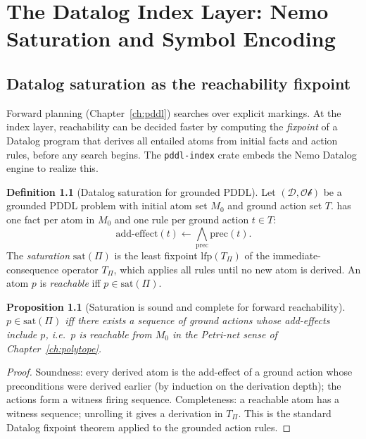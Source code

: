 \documentclass[11pt,oneside]{book}
\theoremstyle{definition}
\newtheorem{definition}{Definition}[chapter]
\theoremstyle{plain}
\newtheorem{proposition}[theorem]{Proposition}
\theoremstyle{remark}
\newcommand{\code}[1]{\texttt{#1}}
\begin{document}
\chapter{The Datalog Index Layer: Nemo Saturation and Symbol Encoding}
\label{ch:pddlindex}

\section{Datalog saturation as the reachability fixpoint}

Forward planning (Chapter~\ref{ch:pddl}) searches over explicit markings. At the index
layer, reachability can be decided faster by computing the \emph{fixpoint} of a Datalog
program that derives all entailed atoms from initial facts and action rules, before any
search begins. The \code{pddl-index} crate embeds the Nemo Datalog engine to realize this.

\begin{definition}[Datalog saturation for grounded PDDL]\label{def:saturation}
Let $(\mathcal{D},\mathcal{Ob})$ be a grounded PDDL problem with initial atom set $M_0$ and ground action set $T$.%
has one fact per atom in $M_0$ and one rule per ground action $t\in T$:%
\[
\text{add-effect}(t) \leftarrow \bigwedge_{\text{prec}} \text{prec}(t).
\]
The \emph{saturation} $\mathrm{sat}(\Pi)$ is the least fixpoint $\mathrm{lfp}(T_{\Pi})$
of the immediate-consequence operator $T_{\Pi}$, which applies all rules until no new
atom is derived. An atom $p$ is \emph{reachable} iff $p\in\mathrm{sat}(\Pi)$.
\end{definition}

\begin{proposition}[Saturation is sound and complete for forward reachability]
\label{prop:satcorrect}
$p\in\mathrm{sat}(\Pi)$ iff there exists a sequence of ground actions whose add-effects
include $p$, i.e.\ $p$ is reachable from $M_0$ in the Petri-net sense of
Chapter~\ref{ch:polytope}.%
\end{proposition}

\begin{proof}
Soundness: every derived atom is the add-effect of a ground action whose preconditions
were derived earlier (by induction on the derivation depth); the actions form a witness
firing sequence. Completeness: a reachable atom has a witness sequence; unrolling it
gives a derivation in $T_{\Pi}$. This is the standard Datalog fixpoint theorem
\cite{kowalski1974,lloyd1987} applied to the grounded action rules.
\end{proof}
\end{document}
